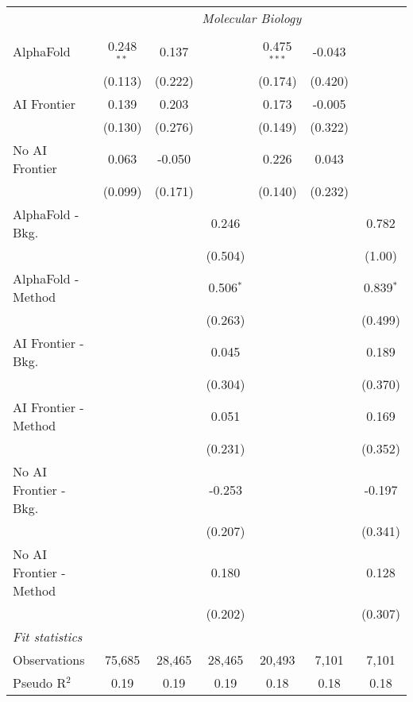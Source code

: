 \begin{tabular}{lcccccc}
 & \multicolumn{6}{c}{\textit{Molecular Biology}} \\ \\
   AlphaFold               & 0.248$^{**}$ & 0.137   &             & 0.475$^{***}$ & -0.043  &   \\   
                           & (0.113)      & (0.222) &             & (0.174)       & (0.420) &   \\   
   AI Frontier             & 0.139        & 0.203   &             & 0.173         & -0.005  &   \\   
                           & (0.130)      & (0.276) &             & (0.149)       & (0.322) &   \\   
   No AI Frontier          & 0.063        & -0.050  &             & 0.226         & 0.043   &   \\   
                           & (0.099)      & (0.171) &             & (0.140)       & (0.232) &   \\   
   AlphaFold - Bkg.        &              &         & 0.246       &               &         & 0.782\\   
                           &              &         & (0.504)     &               &         & (1.00)\\   
   AlphaFold - Method      &              &         & 0.506$^{*}$ &               &         & 0.839$^{*}$\\   
                           &              &         & (0.263)     &               &         & (0.499)\\   
   AI Frontier - Bkg.      &              &         & 0.045       &               &         & 0.189\\   
                           &              &         & (0.304)     &               &         & (0.370)\\   
   AI Frontier - Method    &              &         & 0.051       &               &         & 0.169\\   
                           &              &         & (0.231)     &               &         & (0.352)\\   
   No AI Frontier - Bkg.   &              &         & -0.253      &               &         & -0.197\\   
                           &              &         & (0.207)     &               &         & (0.341)\\   
   No AI Frontier - Method &              &         & 0.180       &               &         & 0.128\\   
                           &              &         & (0.202)     &               &         & (0.307)\\   
   \midrule
   \emph{Fit statistics}\\
   Observations            & 75,685       & 28,465  & 28,465      & 20,493        & 7,101   & 7,101\\  
   Pseudo R$^2$            & 0.19         & 0.19    & 0.19        & 0.18          & 0.18    & 0.18\\  
   

\end{tabular}
